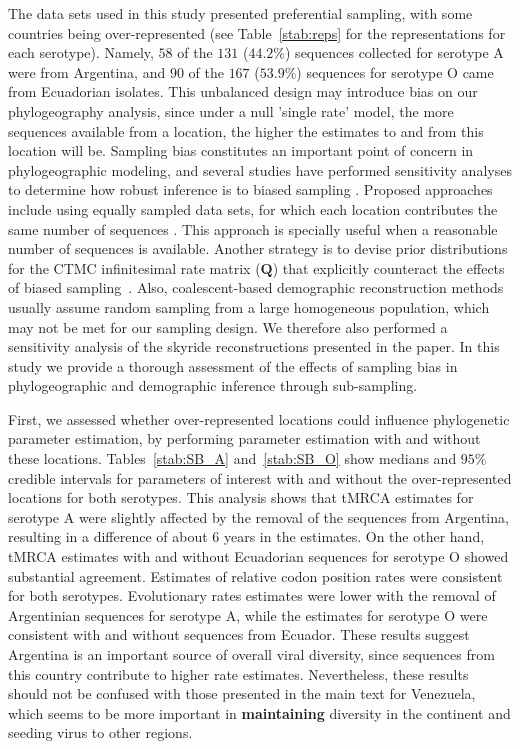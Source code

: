 \documentclass[a4paper,10pt]{article}
\begin{document}
The data sets used in this study presented preferential sampling, with some countries being over-represented (see Table~\ref{stab:reps} for the representations for each serotype).
Namely, $58$ of the $131$ ($44.2\%$) sequences collected for serotype A were from Argentina, and $90$ of the $167$ ($53.9\%$) sequences for serotype O came from Ecuadorian isolates.
This unbalanced design may introduce bias on our phylogeography analysis, since under a null 'single rate' model, the more sequences available from a location, the higher the estimates to and from this location will be.
Sampling bias constitutes an important point of concern in phylogeographic modeling, and several studies have performed sensitivity analyses to determine how robust inference is to biased sampling \cite{M-Faria2012, M-Lemey2014, M-polar, M-fluPNAS}.
Proposed approaches include using equally sampled data sets, for which each location contributes the same number of sequences \cite{M-fluPNAS}.
This approach is specially useful when a reasonable number of sequences is available.
Another strategy is to devise prior distributions for the CTMC infinitesimal rate matrix ($\mathbf{Q}$) that explicitly counteract the effects of biased sampling~\cite{M-Faria2012}.
Also, coalescent-based demographic reconstruction methods usually assume random sampling from a large homogeneous population, which may not be met for our sampling design.
We therefore also performed a sensitivity analysis of the skyride reconstructions presented in the paper.
In this study we provide a thorough assessment of the effects of sampling bias in phylogeographic and demographic inference through sub-sampling. 

First, we assessed whether over-represented locations could influence phylogenetic parameter estimation, by performing parameter estimation with and without these locations.
Tables~\ref{stab:SB_A} and~\ref{stab:SB_O} show medians and $95 \%$ credible intervals for parameters of interest with and without the over-represented locations for both serotypes.
This analysis shows that tMRCA estimates for serotype A were slightly affected by the removal of the sequences from Argentina, resulting in a difference of about 6 years in the estimates.
On the other hand, tMRCA estimates with and without Ecuadorian sequences for serotype O showed substantial agreement.
Estimates of relative codon position rates were consistent for both serotypes.
Evolutionary rates estimates were lower with the removal of Argentinian sequences for serotype A, while the estimates for serotype O were consistent with and without sequences from Ecuador. 
These results suggest Argentina is an important source of overall viral diversity, since sequences from this country contribute to higher rate estimates.
Nevertheless, these results should not be confused with those presented in the main text for Venezuela, which seems to be more important in \textbf{maintaining} diversity in the continent and seeding virus to other regions.
\end{document}

